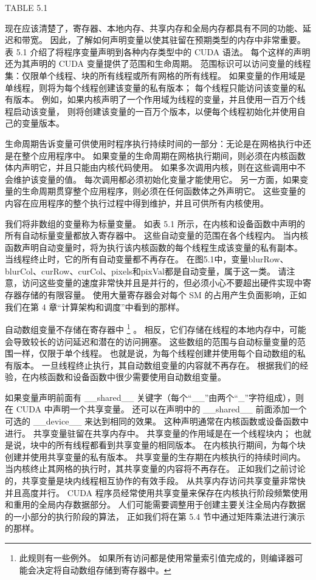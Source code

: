 {\color{red} TABLE 5.1}

现在应该清楚了，寄存器、本地内存、共享内存和全局内存都具有不同的功能、延迟和带宽。 
因此，了解如何声明变量以使其驻留在预期类型的内存中非常重要。 表 5.1 介绍了将程序变量声明到各种内存类型中的 CUDA 语法。 
每个这样的声明还为其声明的 CUDA 变量提供了范围和生命周期。 
范围标识可以访问变量的线程集：仅限单个线程、块的所有线程或所有网格的所有线程。 
如果变量的作用域是单线程，则将为每个线程创建该变量的私有版本； 每个线程只能访问该变量的私有版本。 
例如，如果内核声明了一个作用域为线程的变量，并且使用一百万个线程启动该变量，
则将创建该变量的一百万个版本，以便每个线程初始化并使用自己的变量版本。

生命周期告诉变量可供使用时程序执行持续时间的一部分：无论是在网格执行中还是在整个应用程序中。 
如果变量的生命周期在网格执行期间，则必须在内核函数体内声明它，并且只能由内核代码使用。 
如果多次调用内核，则在这些调用中不会维护该变量的值。 每次调用都必须初始化变量才能使用它。 
另一方面，如果变量的生命周期贯穿整个应用程序，则必须在任何函数体之外声明它。 
这些变量的内容在应用程序的整个执行过程中得到维护，并且可供所有内核使用。

我们将非数组的变量称为标量变量。 如表 5.1 所示，在内核和设备函数中声明的所有自动标量变量都放入寄存器中。 
这些自动变量的范围在各个线程内。 当内核函数声明自动变量时，将为执行该内核函数的每个线程生成该变量的私有副本。 
当线程终止时，它的所有自动变量都不再存在。 
在图5.1中，变量blurRow、blurCol、curRow、curCol、pixels和pixVal都是自动变量，属于这一类。 
请注意，访问这些变量的速度非常快并且是并行的，但必须小心不要超出硬件实现中寄存器存储的有限容量。 
使用大量寄存器会对每个 SM 的占用产生负面影响，正如我们在第 4 章“计算架构和调度”中看到的那样。

自动数组变量不存储在寄存器中
\footnote{此规则有一些例外。 如果所有访问都是使用常量索引值完成的，则编译器可能会决定将自动数组存储到寄存器中。} 。
相反，它们存储在线程的本地内存中，可能会导致较长的访问延迟和潜在的访问拥塞。 
这些数组的范围与自动标量变量的范围一样，仅限于单个线程。 也就是说，为每个线程创建并使用每个自动数组的私有版本。 
一旦线程终止执行，其自动数组变量的内容就不再存在。 根据我们的经验，在内核函数和设备函数中很少需要使用自动数组变量。

如果变量声明前面有 \_\_shared\_\_ 关键字（每个“\_\_”由两个“\_”字符组成），则在 CUDA 中声明一个共享变量。 
还可以在声明中的 \_\_shared\_\_ 前面添加一个可选的 \_\_device\_\_ 来达到相同的效果。 
这种声明通常在内核函数或设备函数中进行。 共享变量驻留在共享内存中。 共享变量的作用域是在一个线程块内； 
也就是说，块中的所有线程都看到共享变量的相同版本。 在内核执行期间，为每个块创建并使用共享变量的私有版本。 
共享变量的生存期在内核执行的持续时间内。 当内核终止其网格的执行时，其共享变量的内容将不再存在。 
正如我们之前讨论的，共享变量是块内线程相互协作的有效手段。 从共享内存访问共享变量非常快并且高度并行。 
CUDA 程序员经常使用共享变量来保存在内核执行阶段频繁使用和重用的全局内存数据部分。 
人们可能需要调整用于创建主要关注全局内存数据的一小部分的执行阶段的算法，
正如我们将在第 5.4 节中通过矩阵乘法进行演示的那样。

